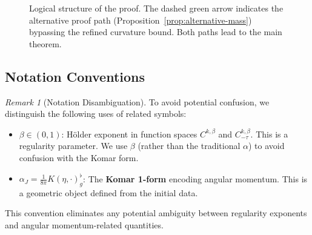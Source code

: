 \documentclass[12pt]{article}
\theoremstyle{plain}
\theoremstyle{definition}
\theoremstyle{remark}
\newtheorem{remark}[theorem]{Remark}
\newcommand{\tg}{\tilde{g}}
\newcommand{\bg}{\bar{g}}
\begin{document}
\begin{figure}[htbp]
\centering
{}
\caption{Logical structure of the proof. The dashed green arrow indicates the alternative proof path (Proposition~\ref{prop:alternative-mass}) bypassing the refined curvature bound. Both paths lead to the main theorem.}
\end{figure}

\subsection*{Notation Conventions}
\label{subsec:notation-conventions}

\begin{remark}[Notation Disambiguation]\label{rem:notation-disambiguation}
To avoid potential confusion, we distinguish the following uses of related symbols:
\begin{itemize}
    \item $\beta \in (0,1)$: H\"older exponent in function spaces $C^{k,\beta}$ and $C^{k,\beta}_{-\tau}$. This is a regularity parameter. We use $\beta$ (rather than the traditional $\alpha$) to avoid confusion with the Komar form.
    \item $\alpha_J = \frac{1}{8\pi}K(\eta, \cdot)^\flat_g$: The \textbf{Komar 1-form} encoding angular momentum. This is a geometric object defined from the initial data.
\end{itemize}
This convention eliminates any potential ambiguity between regularity exponents and angular momentum-related quantities.
\end{remark}
\end{document}

